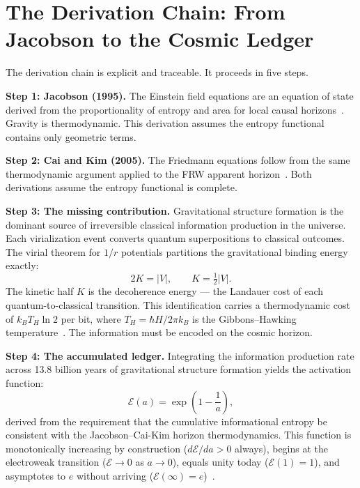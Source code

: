 \documentclass[12pt,a4paper]{article}
\begin{document}
\section{The Derivation Chain: From Jacobson to the Cosmic Ledger}
\label{sec:derivation}

The derivation chain is explicit and traceable. It proceeds in five steps.

\textbf{Step 1: Jacobson (1995).} The Einstein field equations are an
equation of state derived from the proportionality of entropy and area
for local causal horizons~\citep{Jacobson1995}. Gravity is thermodynamic.
This derivation assumes the entropy functional contains only geometric
terms.

\textbf{Step 2: Cai and Kim (2005).} The Friedmann equations follow from
the same thermodynamic argument applied to the FRW apparent
horizon~\citep{CaiKim2005}. Both derivations assume the entropy functional
is complete.

\textbf{Step 3: The missing contribution.} Gravitational structure
formation is the dominant source of irreversible classical information
production in the universe. Each virialization event converts quantum
superpositions to classical outcomes. The virial theorem for $1/r$
potentials partitions the gravitational binding energy exactly:
\begin{equation}
2K = |V|, \qquad K = \tfrac{1}{2}|V|.
\label{eq:virial}
\end{equation}
The kinetic half $K$ is the decoherence energy --- the Landauer cost of
each quantum-to-classical transition. This identification carries a
thermodynamic cost of $k_B T_H \ln 2$ per bit, where
$T_H = \hbar H / 2\pi k_B$ is the Gibbons--Hawking
temperature~\citep{Gibbons1977}. The information must be encoded on the
cosmic horizon.

\textbf{Step 4: The accumulated ledger.} Integrating the information
production rate across 13.8 billion years of gravitational structure
formation yields the activation function:
\begin{equation}
\mathcal{E}(a) = \exp\!\left(1 - \frac{1}{a}\right),
\label{eq:Ea}
\end{equation}
derived from the requirement that the cumulative informational entropy be
consistent with the Jacobson--Cai-Kim horizon thermodynamics. This
function is monotonically increasing by construction ($d\mathcal{E}/da >
0$ always), begins at the electroweak transition ($\mathcal{E} \to 0$ as
$a \to 0$), equals unity today ($\mathcal{E}(1) = 1$), and asymptotes to
$e$ without arriving ($\mathcal{E}(\infty) = e$)~\citep{IAM_time}.
\end{document}

